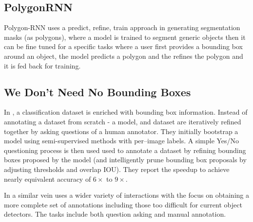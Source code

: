 \subsection {PolygonRNN}
Polygon-RNN \cite{Castrejon2017} uses a predict, refine, train approach in generating segmentation masks (as polygons), where a model is trained to segment generic objects then it can be fine tuned for a specific tasks where a user first provides a bounding box around an object, the model predicts a polygon and the refines the polygon and it is fed back for training.

\subsection {We Don't Need No Bounding Boxes}
In \cite{Papadopoulos2016}, a classification dataset is enriched with bounding box information. Instead of annotating a dataset from scratch - a model, and dataset are iteratively refined together by asking questions of a human annotator. They initially bootstrap a model using semi-supervised methods with per--image labels. A simple Yes/No questioning process is then used used to annotate a dataset by refining bounding boxes proposed by the model (and intelligently prune bounding box proposals by adjusting thresholds and overlap \gls{IOU}). They report the speedup to achieve nearly equivalent accuracy of $6\times$ to $9\times$.

In a similar vein \cite{Russakovsky2015a} uses a wider variety of interactions with the focus on obtaining a more complete set of annotations including those too difficult for current object detectors. The tasks include both question asking and manual annotation.















